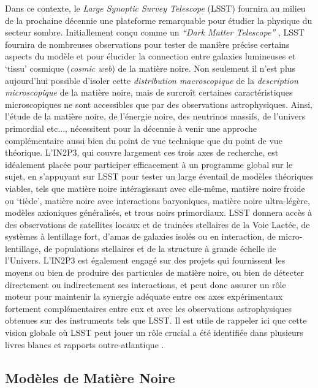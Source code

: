 \documentclass[12pt]{article}
\begin{document}
Dans ce contexte, le {\it Large Synoptic Survey Telescope} (LSST) fournira au milieu de la prochaine décennie une plateforme remarquable pour étudier la physique du secteur sombre. Initiallement conçu comme un {\it ``Dark Matter Telescope''} \citep{Tyson:2001}, LSST fournira de nombreuses observations pour tester de manière précise certains aspects du modèle \LCDM et pour élucider la connection entre galaxies lumineuses et `tissu' cosmique ({\it cosmic web}) de la matière noire. Non seulement il n'est plus aujourd'hui possible d'isoler cette \emph{distribution macroscopique} de la \emph{description microscopique} de la matière noire, mais de surcroît certaines caractéristiques microscopiques ne sont accessibles que par des observations astrophysiques. 
Ainsi, l'étude de la matière noire, de l'énergie noire, des neutrinos massifs, de l'univers primordial etc..., nécessitent pour la décennie à venir une approche complémentaire aussi bien du point de vue technique que du point de vue théorique. L'IN2P3, qui couvre largement ces trois axes de recherche, est idéalement placée pour participer efficacement à un programme global sur le sujet, en s'appuyant sur LSST pour tester un large éventail de modèles théoriques viables, tels que matière noire intéragissant avec elle-même, matière noire froide ou `tiède', matière noire avec interactions baryoniques, matière noire ultra-légère, modèles axioniques généralisés, et trous noirs primordiaux. LSST donnera accès à des observations de satellites locaux et de trainées stellaires de la Voie Lactée, de systèmes à lentillage fort, d'amas de galaxies isolés ou en interaction, de micro-lentillage, de populations stellaires et de la structure à grande échelle de l'Univers. L'IN2P3 est également engagé sur des projets qui fournissent les moyens ou bien de produire des particules de matière noire, ou bien de détecter directement ou indirectement ses interactions, et peut donc assurer un rôle moteur pour maintenir la synergie adéquate entre ces axes expérimentaux fortement complémentaires entre eux et avec les observations astrophysiques obtenues sur des instruments tels que LSST. Il est utile de rappeler ici que cette vision globale où LSST peut jouer un rôle crucial a été identifiée dans plusieurs livres blancs et rapports outre-atlantique \citep{Astro2010,1310.8642, 1310.5662, 1305.1605,P5Report,1604.07626,1802.07216,Battaglieri:2017aum}.

\vspace{-1em} \subsection*{Modèles de Matière Noire} \vspace{-0.5em}
\end{document}
